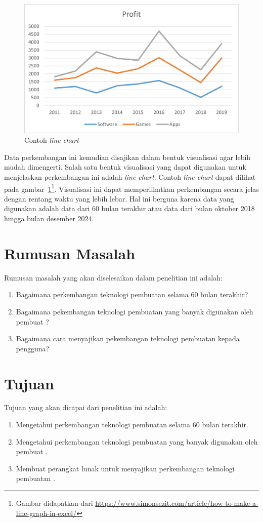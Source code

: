         \begin{figure}[]
        \centering
        \includegraphics[width=0.5\linewidth]{Gambar/contoh linechart.jpg}
        \caption{Contoh \textit{line chart}}
        \label{fig:contohlinechart}
    \end{figure}

    Data perkembangan ini kemudian disajikan dalam bentuk visualisasi agar lebih mudah dimengerti. Salah satu bentuk visualisasi yang dapat digunakan untuk menjelaskan perkembangan ini adalah \textit{line chart}. Contoh \textit{line chart} dapat dilihat pada gambar~\ref{fig:contohlinechart}\footnote{Gambar didapatkan dari \url{https://www.simonsezit.com/article/how-to-make-a-line-graph-in-excel/}}. Visualisasi ini dapat memperlihatkan perkembangan secara jelas dengan rentang waktu yang lebih lebar. Hal ini berguna karena data yang digunakan adalah data dari 60 bulan terakhir atau data dari bulan oktober 2018 hingga bulan desember 2024.
    
\section{Rumusan Masalah}
	Rumusan masalah yang akan diselesaikan dalam penelitian ini adalah:
    \begin{enumerate}
        \item Bagaimana perkembangan teknologi pembuatan \web selama 60 bulan terakhir?
        \item Bagaimana pekembangan teknologi pembuatan \web yang banyak digunakan oleh pembuat \web?
        \item Bagaimana cara menyajikan pekembangan teknologi pembuatan \web kepada pengguna?
    \end{enumerate}
	
\section{Tujuan}
	Tujuan yang akan dicapai dari penelitian ini adalah:
    \begin{enumerate}
        \item Mengetahui perkembangan teknologi pembuatan \web selama 60 bulan terakhir.
        \item Mengetahui perkembangan teknologi pembuatan \web yang banyak digunakan oleh pembuat \web.
        \item Membuat perangkat lunak untuk menyajikan perkembangan teknologi pembuatan \web.
    \end{enumerate}
